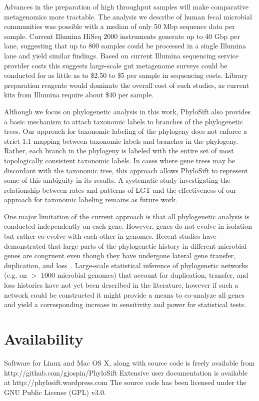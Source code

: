 \documentclass[10pt]{article}
\begin{document}
Advances in the preparation of high throughput samples will make comparative metagenomics more tractable.
The analysis we describe of human fecal microbial communities was possible with a median of only 50 Mbp sequence data per sample.
Current Illumina HiSeq 2000 instruments generate up to 40 Gbp per lane, suggesting that up to 800 samples could be processed in a single Illumina lane and yield similar findings.
Based on current Illumina sequencing service provider costs this suggests large-scale gut metagenome surveys could be conducted for as little as to \$2.50 to \$5 per sample in sequencing costs.
Library preparation reagents would dominate the overall cost of such studies, as current kits from Illumina require about \$40 per sample.

Although we focus on phylogenetic analysis in this work, PhyloSift also provides a basic mechanism to attach taxonomic labels to branches of the phylogenetic trees.
Our approach for taxonomic labeling of the phylogeny does not enforce a strict 1:1 mapping between taxonomic labels and  branches in the phylogeny.
Rather, each branch in the phylogeny is labeled with the entire set of most topologically consistent taxonomic labels.
In cases where gene trees may be discordant with the taxonomic tree, this approach allows PhyloSift to represent some of this ambiguity in its results.
A systematic study investigating the relationship between rates and patterns of LGT and the effectiveness of our approach for taxonomic labeling remains as future work.

One major limitation of the current approach is that all phylogenetic analysis is conducted independently on each gene.
However, genes do not evolve in isolation but rather co-evolve with each other in genomes.
Recent studies have demonstrated that large parts of the phylogenetic history in different microbial genes are congruent even though they have undergone lateral gene transfer, duplication, and loss~\cite{Szollosi2012,Boussau2012}.
Large-scale statistical inference of phylogenetic networks (e.g. on $>$ 1000 microbial genomes) that account for duplication, transfer, and loss histories have not yet been described in the literature, however if such a network could be constructed it might provide a means to co-analyze all genes and yield a corresponding increase in sensitivity and power for statistical tests.

\section*{Availability}
Software for Linux and Mac OS X, along with source code is freely available from http://github.com/gjospin/PhyloSift
Extensive user documentation is available at http://phylosift.wordpress.com
The source code has been licensed under the GNU Public License (GPL) v3.0.
\end{document}

